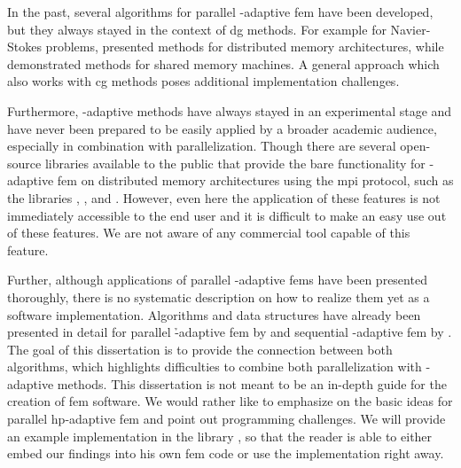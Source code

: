 

In the past, several algorithms for parallel \hp-adaptive \gls{fem} have been developed, but they always stayed in the context of \gls{dg} methods. For example for Navier-Stokes problems, \textcites{paszynski2006}{chalmers2019} presented methods for distributed memory architectures, while \textcites{paszynski2011}{jomo2017} demonstrated methods for shared memory machines. A general approach which also works with \gls{cg} methods poses additional implementation challenges. %


Furthermore, \hp-adaptive methods have always stayed in an experimental stage and have never been prepared to be easily applied by a broader academic audience, especially in combination with parallelization.
Though there are several open-source libraries available to the public that provide the bare functionality for \hp-adaptive \gls{fem} on distributed memory architectures using the \gls{mpi} protocol, such as the libraries \phaml{} \parencite{mitchell2002,phaml1200}, \phg{} \parencite{zhanglin-bo2019,phg094}, and \mofem{} \parencite{kaczmarczyk2020,mofem090}. However, even here the application of these features is not immediately accessible to the end user and it is difficult to make an easy use out of these features. We are not aware of any commercial tool capable of this feature.




Further, although applications of parallel \hp-adaptive \glspl{fem} have been presented thoroughly, there is no systematic description on how to realize them yet as a software implementation.
Algorithms and data structures have already been presented in detail for parallel \h-adaptive \gls{fem} by \textcite{bangerth2012} and sequential \hp-adaptive \gls{fem} by \textcite{bangerth2009}.
The goal of this dissertation is to provide the connection between both algorithms, which highlights difficulties to combine both parallelization with \hp-adaptive methods. This dissertation is not meant to be an in-depth guide for the creation of \gls{fem} software. We would rather like to emphasize on the basic ideas for parallel hp-adaptive \gls{fem} and point out programming challenges. We will provide an example implementation in the \dealii{} library \parencite{bangerth2007, dealii920pre}, so that the reader is able to either embed our findings into his own \gls{fem} code or use the \dealii{} implementation right away.

